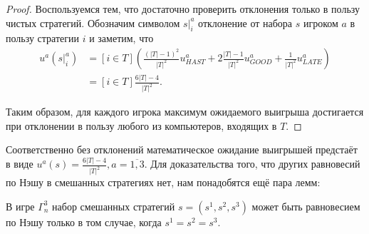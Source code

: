 \begin{proof}
	Воспользуемся тем, что достаточно проверить отклонения только в пользу чистых стратегий. Обозначим символом $\left. s \right|^a_i$ отклонение от набора $s$ игроком $a$ в пользу стратегии $i$ и заметим, что 
	\begin{align*}
		u^a(\left. s \right|^a_i) &= [i \in T] \left(\frac{(\left| T \right| - 1)^2}{\left| T \right|^2} u^a_{HAST} + 2 \frac{\left| T \right| - 1}{\left| T \right|^2} u^a_{GOOD} + \frac{1}{\left| T \right|^2} u^a_{LATE}\right)\\
		&= [i \in T] \frac{6 \left| T \right| - 4}{\left| T \right|^2}.
	\end{align*}
	
	Таким образом, для каждого игрока максимум ожидаемого выигрыша достигается при отклонении в пользу любого из компьютеров, входящих в $T$.
\end{proof}

Соответственно без отклонений математическое ожидание выигрышей предстаёт в виде $u^a(s) = \frac{6 \left| T \right| - 4}{\left| T \right|^2}, a = \overline{1,3}$. Для доказательства того, что других равновесий по Нэшу в смешанных стратегиях нет, нам понадобятся ещё пара лемм:

\begin{lemma}
	В игре $\Gamma^3_n$ набор смешанных стратегий $s = (s^1, s^2, s^3)$ может быть равновесием по Нэшу только в том случае, когда $s^1 = s^2 = s^3$.
\end{lemma}

